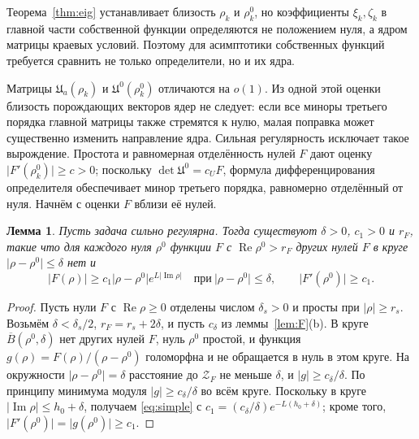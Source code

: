 \documentclass[12pt,a4paper]{article}
\numberwithin{equation}{section}
\newtheorem{lemma}{Лемма}
\theoremstyle{definition}
\newcommand{\abs}[1]{\lvert#1\rvert}
\newcommand{\Imm}{\operatorname{Im}}
\newcommand{\Ree}{\operatorname{Re}}
\newcommand{\Uf}{\mathfrak U}
\newcommand{\Zf}{\mathcal Z_F}
\begin{document}
Теорема~\ref{thm:eig} устанавливает близость $\rho_k$ и $\rho_k^0$, но
коэффициенты $\xi_k,\zeta_k$ в главной части собственной функции определяются
не положением нуля, а ядром матрицы краевых условий. Поэтому для асимптотики
собственных функций требуется сравнить не только определители, но и их ядра.

Матрицы $\Uf_a(\rho_k)$ и $\Uf^0(\rho_k^0)$ отличаются на $o(1)$.
Из одной этой оценки близость порождающих векторов ядер не следует:
если все миноры третьего порядка главной матрицы также стремятся к нулю,
малая поправка может существенно изменить направление ядра.
Сильная регулярность исключает такое вырождение. Простота и равномерная
отделённость нулей $F$ дают оценку $\abs{F'(\rho_k^0)}\ge c>0$;
поскольку $\det\Uf^0=c_UF$, формула дифференцирования определителя
обеспечивает минор третьего порядка, равномерно отделённый от нуля.
Начнём с оценки $F$ вблизи её нулей.

\begin{lemma}\label{lem:simple}
Пусть задача сильно регулярна. Тогда существуют $\delta>0$, $c_1>0$ и $r_F$, такие что для
каждого нуля $\rho^0$ функции $F$ с $\Ree\rho^0>r_F$ других нулей $F$ в круге
$\abs{\rho-\rho^0}\le\delta$ нет и
\begin{equation}\label{eq:simple}
 \abs{F(\rho)}\ge c_1\abs{\rho-\rho^0}e^{L\abs{\Imm\rho}}\quad\text{при}\ \abs{\rho-\rho^0}\le\delta,\qquad
 \abs{F'(\rho^0)}\ge c_1.
\end{equation}
\end{lemma}

\begin{proof}
Пусть нули $F$ с $\Ree\rho\ge0$ отделены числом $\delta_s>0$ и просты при $\abs\rho\ge r_s$.
Возьмём $\delta<\delta_s/2$, $r_F=r_s+2\delta$, и пусть $c_\delta$ из леммы~\ref{lem:F}(b). В круге
$\overline B(\rho^0,\delta)$ нет других нулей $F$, нуль $\rho^0$ простой, и функция
$g(\rho)=F(\rho)/(\rho-\rho^0)$ голоморфна и не обращается в нуль в этом круге. На окружности
$\abs{\rho-\rho^0}=\delta$ расстояние до $\Zf$ не меньше $\delta$, и
$\abs g\ge c_\delta/\delta$. По принципу минимума модуля $\abs g\ge c_\delta/\delta$ во всём круге.
Поскольку в круге $\abs{\Imm\rho}\le h_0+\delta$, получаем \eqref{eq:simple} с
$c_1=(c_\delta/\delta)e^{-L(h_0+\delta)}$; кроме того, $\abs{F'(\rho^0)}=\abs{g(\rho^0)}\ge c_1$.
\end{proof}
\end{document}
